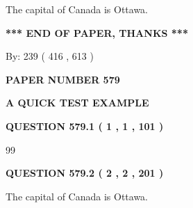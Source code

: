 \documentclass[12pt]{article}
\begin{document}
 
\noindent{}
 
 
The capital of Canada is Ottawa.
 
 
 
 
   
   
 \vspace{0.2in}
 
   
   
   
   
\vspace{1.0in} 
{\textbf{\large{ *** END OF PAPER, THANKS *** }}} 
   
   
\hspace{1.0in} By: 
 239 ( 416 ,  613 )
   
   
   
   
\newpage 
\setcounter{page}{ 
   579001 } 
   
   
   
   
 {\textbf{ \Large{ PAPER NUMBER  579  }}}
   
   
\vspace{0.2in}
   
   
   
   
   
   
 \vspace{0.2in}
{\LARGE {\textbf{ A QUICK TEST EXAMPLE}}}
   
   
  
\vspace{0.2in}
  
{\textbf{\Large{QUESTION
579.1 
 ( 1 , 1 , 101 )
}}}
  
  
 
 
\noindent{}

99
 
 
  
\vspace{0.2in}
  
{\textbf{\Large{QUESTION
579.2 
 ( 2 , 2 , 201 )
}}}
  
  
 
 
\noindent{}
 
 
The capital of Canada is Ottawa.
 
 
 
\end{document}
